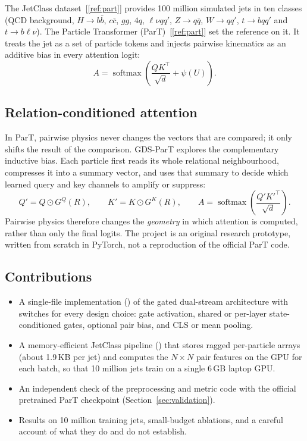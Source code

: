 \documentclass[11pt,a4paper]{article}
\newcommand{\softmax}{\operatorname{softmax}}
\newcommand{\Had}{\odot}
\newcommand{\code}[1]{\texttt{\small\detokenize{#1}}}
\numberwithin{equation}{section}
\begin{document}
The JetClass dataset~[\ref{ref:part}] provides 100 million simulated jets in ten classes
(QCD background, $H\to b\bar b$, $c\bar c$, $gg$, $4q$, $\ell\nu qq'$, $Z\to q\bar q$, $W\to qq'$,
$t\to bqq'$ and $t\to b\ell\nu$). The Particle Transformer (ParT)~[\ref{ref:part}] set the reference
on it. It treats the jet as a set of particle tokens and injects pairwise kinematics as an
additive bias in every attention logit:
\begin{equation}
 A=\softmax\!\left(\frac{QK^\top}{\sqrt d}+\psi(U)\right).
\end{equation}

\subsection{Relation-conditioned attention}
In ParT, pairwise physics never changes the vectors that are compared; it only shifts the
result of the comparison. GDS-ParT explores the complementary inductive bias. Each particle
first reads its whole relational neighbourhood, compresses it into a summary vector, and uses
that summary to decide which learned query and key channels to amplify or suppress:
\begin{equation}
 Q'=Q\Had G^Q(R),\qquad K'=K\Had G^K(R),\qquad
 A=\softmax\!\left(\frac{Q'K'^\top}{\sqrt d}\right).
\end{equation}
Pairwise physics therefore changes the \emph{geometry} in which attention is computed, rather
than only the final logits. The project is an original research prototype, written from scratch
in PyTorch, not a reproduction of the official ParT code.

\subsection{Contributions}
\begin{itemize}
 \item A single-file implementation (\code{gds_part_colab.py}) of the gated dual-stream
   architecture with switches for every design choice: gate activation, shared or per-layer
   state-conditioned gates, optional pair bias, and CLS or mean pooling.
 \item A memory-efficient JetClass pipeline (\code{data/jetclass_cache.py}) that stores ragged
   per-particle arrays (about 1.9\,KB per jet) and computes the $N\times N$ pair features on the GPU
   for each batch, so that 10 million jets train on a single 6\,GB laptop GPU.
 \item An independent check of the preprocessing and metric code with the official pretrained
   ParT checkpoint (Section~\ref{sec:validation}).
 \item Results on 10 million training jets, small-budget ablations, and a careful account of what
   they do and do not establish.
\end{itemize}
\end{document}
